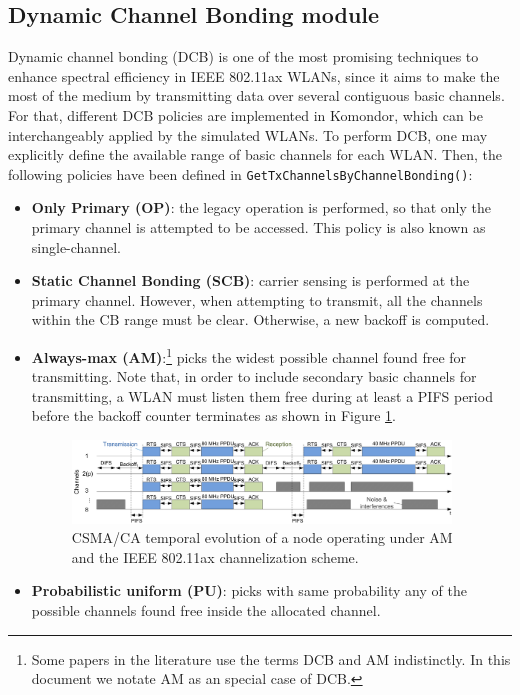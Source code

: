 \documentclass[a4paper]{article}
\begin{document}
\subsection{Dynamic Channel Bonding module}
Dynamic channel bonding (DCB) is one of the most promising techniques to enhance spectral efficiency in IEEE 802.11ax WLANs, since it aims to make the most of the medium by transmitting data over several contiguous basic channels. For that, different DCB policies are implemented in Komondor, which can be interchangeably applied by the simulated WLANs. To perform DCB, one may explicitly define the available range of basic channels for each WLAN. Then, the following policies have been defined in \texttt{GetTxChannelsByChannelBonding()}:
\begin{itemize}
	\item \textbf{Only Primary (OP)}: the legacy operation is performed, so that only the primary channel is attempted to be accessed. This policy is also known as single-channel.
	\item \textbf{Static Channel Bonding (SCB)}: carrier sensing is performed at the primary channel. However, when attempting to transmit, all the channels within the CB range must be clear. Otherwise, a new backoff is computed.
	\item \textbf{Always-max (AM)}:\footnote{Some papers in the literature use the terms DCB and AM indistinctly. In this document we notate AM as an special case of DCB.} picks the widest possible channel found free for transmitting. Note that, in order to include secondary basic channels for transmitting, a WLAN must listen them free during at least a PIFS period before the backoff counter terminates as shown in Figure \ref{fig:dcb_dcf}.
	\begin{figure}
		\centering
		\includegraphics[width=0.95\textwidth]{images/dcb_dcf.png}
		\caption{CSMA/CA temporal evolution of a node operating under AM and the IEEE 802.11ax channelization scheme.}
		\label{fig:dcb_dcf}
	\end{figure}
	\item \textbf{Probabilistic uniform (PU)}: picks with same probability any of the possible channels found free inside the allocated channel.
	
\end{itemize}
\end{document}
